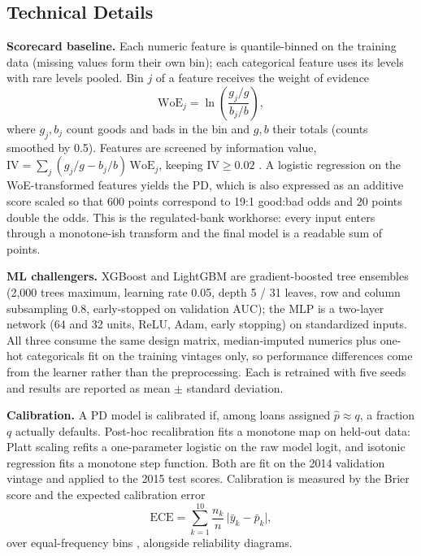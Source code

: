 \documentclass[a4paper,twocolumn,10pt]{article}
\begin{document}
\subsection{Technical Details}

\textbf{Scorecard baseline.} Each numeric feature is quantile-binned on the training data (missing values form their own bin); each categorical feature uses its levels with rare levels pooled. Bin $j$ of a feature receives the weight of evidence
\begin{equation}
\mathrm{WoE}_j = \ln\!\left(\frac{g_j / g}{b_j / b}\right),
\label{eq:woe}
\end{equation}
where $g_j, b_j$ count goods and bads in the bin and $g, b$ their totals (counts smoothed by 0.5). Features are screened by information value, $\mathrm{IV} = \sum_j (g_j/g - b_j/b)\,\mathrm{WoE}_j$, keeping $\mathrm{IV} \ge 0.02$ \cite{siddiqi2006}. A logistic regression on the WoE-transformed features yields the PD, which is also expressed as an additive score scaled so that 600 points correspond to 19:1 good:bad odds and 20 points double the odds. This is the regulated-bank workhorse: every input enters through a monotone-ish transform and the final model is a readable sum of points.

\textbf{ML challengers.} XGBoost \cite{chen2016} and LightGBM \cite{ke2017} are gradient-boosted tree ensembles (2{,}000 trees maximum, learning rate 0.05, depth 5 / 31 leaves, row and column subsampling 0.8, early-stopped on validation AUC); the MLP is a two-layer network (64 and 32 units, ReLU, Adam, early stopping) on standardized inputs. All three consume the same design matrix, median-imputed numerics plus one-hot categoricals fit on the training vintages only, so performance differences come from the learner rather than the preprocessing. Each is retrained with five seeds and results are reported as mean $\pm$ standard deviation.

\textbf{Calibration.} A PD model is calibrated if, among loans assigned $\hat p \approx q$, a fraction $q$ actually defaults. Post-hoc recalibration fits a monotone map on held-out data: Platt scaling \cite{platt1999} refits a one-parameter logistic on the raw model logit, and isotonic regression \cite{zadrozny2002} fits a monotone step function. Both are fit on the 2014 validation vintage and applied to the 2015 test scores. Calibration is measured by the Brier score and the expected calibration error
\begin{equation}
\mathrm{ECE} = \sum_{k=1}^{10} \frac{n_k}{n}\,\bigl|\bar y_k - \bar p_k\bigr|,
\label{eq:ece}
\end{equation}
over equal-frequency bins \cite{guo2017}, alongside reliability diagrams.
\end{document}
